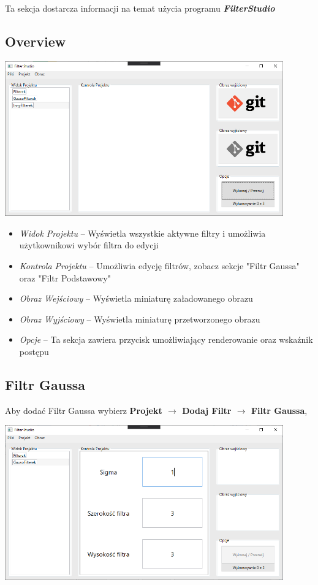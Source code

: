 \documentclass{article}
\begin{document}
Ta sekcja dostarcza informacji na temat użycia programu \textbf{\textit{FilterStudio}}
\subsection{Overview}

\bigskip
\includegraphics[width=0.9\textwidth]{overview.png}

\begin{itemize}
    \item \textit{Widok Projektu} -- Wyświetla wszystkie aktywne filtry i umożliwia użytkownikowi wybór filtra do edycji
    \item \textit{Kontrola Projektu} -- Umożliwia edycję filtrów, zobacz sekcje "Filtr Gaussa" oraz "Filtr Podstawowy"
    \item \textit{Obraz Wejściowy} -- Wyświetla miniaturę załadowanego obrazu
    \item \textit{Obraz Wyjściowy} -- Wyświetla miniaturę przetworzonego obrazu
    \item \textit{Opcje} -- Ta sekcja zawiera przycisk umożliwiający renderowanie oraz wskaźnik postępu
\end{itemize}

\newpage
\subsection{Filtr Gaussa}
Aby dodać Filtr Gaussa wybierz \textbf{Projekt $\rightarrow$ Dodaj Filtr $\rightarrow$ Filtr Gaussa},

\bigskip
\includegraphics[width=0.9\textwidth]{gauss.png}
\bigskip
\end{document}
